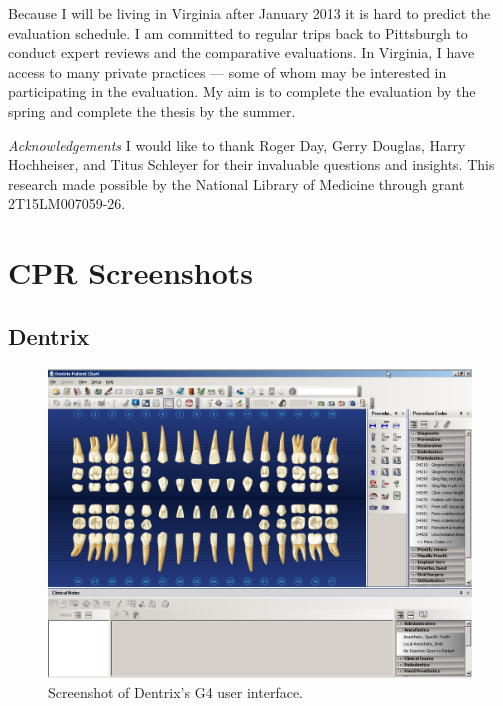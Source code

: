 \documentclass[11pt]{article}
\begin{document}
\vspace{10pt}

\noindent Because I will be living in Virginia after January 2013 it is hard to predict the evaluation schedule. I am committed to regular trips back to Pittsburgh to conduct expert reviews and the comparative evaluations. In Virginia, I have access to many private practices --- some of whom may be interested in participating in the evaluation. My aim is to complete the evaluation by the spring and complete the thesis by the summer.

\vspace{20pt}

\noindent \textit{Acknowledgements} I would like to thank Roger Day, Gerry Douglas, Harry Hochheiser, and Titus Schleyer for their invaluable questions and insights. This research made possible by the National Library of Medicine through grant 2T15LM007059-26.
\newpage

\footnotesize{
}
\newpage

\addappheadtotoc
\appendix


\section{CPR Screenshots}
\label{SS}
\subsection{Dentrix}
\label{dentrixplain}

\begin{figure}[h]
\begin{center}
\includegraphics[width=\textwidth]{dentrixss1.png}
\end{center}
\caption{Screenshot of Dentrix's G4 user interface.}
\end{figure}
\end{document}
